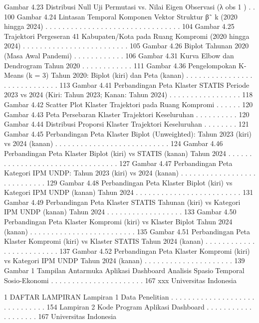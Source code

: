 Gambar 4.23 Distribusi Null Uji Permutasi vs. Nilai Eigen Observasi (λ
obs
1
) . . 100
Gambar 4.24 Lintasan Temporal Komponen Vektor Struktur β˜
k (2020 hingga
2024) . . . . . . . . . . . . . . . . . . . . . . . . . . . . . . . . 104
Gambar 4.25 Trajektori Pergeseran 41 Kabupaten/Kota pada Ruang Kompromi
(2020 hingga 2024) . . . . . . . . . . . . . . . . . . . . . . . . . 105
Gambar 4.26 Biplot Tahunan 2020 (Masa Awal Pandemi) . . . . . . . . . . . . 106
Gambar 4.31 Kurva Elbow dan Dendrogram Tahun 2020 . . . . . . . . . . . . 111
Gambar 4.36 Pengelompokan K-Means (k = 3) Tahun 2020: Biplot (kiri) dan
Peta (kanan) . . . . . . . . . . . . . . . . . . . . . . . . . . . . . 113
Gambar 4.41 Perbandingan Peta Klaster STATIS Periode 2023 vs 2024 (Kiri:
Tahun 2023; Kanan: Tahun 2024) . . . . . . . . . . . . . . . . . 118
Gambar 4.42 Scatter Plot Klaster Trajektori pada Ruang Kompromi . . . . . . 120
Gambar 4.43 Peta Persebaran Klaster Trajektori Keseluruhan . . . . . . . . . . 120
Gambar 4.44 Distribusi Proporsi Klaster Trajektori Keseluruhan . . . . . . . . 121
Gambar 4.45 Perbandingan Peta Klaster Biplot (Unweighted): Tahun 2023 (kiri)
vs 2024 (kanan) . . . . . . . . . . . . . . . . . . . . . . . . . . . 124
Gambar 4.46 Perbandingan Peta Klaster Biplot (kiri) vs STATIS (kanan) Tahun
2024 . . . . . . . . . . . . . . . . . . . . . . . . . . . . . . . . . 127
Gambar 4.47 Perbandingan Peta Kategori IPM UNDP: Tahun 2023 (kiri) vs
2024 (kanan) . . . . . . . . . . . . . . . . . . . . . . . . . . . . 129
Gambar 4.48 Perbandingan Peta Klaster Biplot (kiri) vs Kategori IPM UNDP
(kanan) Tahun 2024 . . . . . . . . . . . . . . . . . . . . . . . . . 131
Gambar 4.49 Perbandingan Peta Klaster STATIS Tahunan (kiri) vs Kategori
IPM UNDP (kanan) Tahun 2024 . . . . . . . . . . . . . . . . . . 133
Gambar 4.50 Perbandingan Peta Klaster Kompromi (kiri) vs Klaster Biplot
Tahun 2024 (kanan) . . . . . . . . . . . . . . . . . . . . . . . . . 135
Gambar 4.51 Perbandingan Peta Klaster Kompromi (kiri) vs Klaster STATIS
Tahun 2024 (kanan) . . . . . . . . . . . . . . . . . . . . . . . . . 137
Gambar 4.52 Perbandingan Peta Klaster Kompromi (kiri) vs Kategori IPM
UNDP Tahun 2024 (kanan) . . . . . . . . . . . . . . . . . . . . . 139
Gambar 1 Tampilan Antarmuka Aplikasi Dashboard Analisis SpasioTemporal Sosio-Ekonomi . . . . . . . . . . . . . . . . . . . . . . 167
xxx Universitas Indonesia

1
DAFTAR LAMPIRAN
Lampiran 1 Data Penelitian . . . . . . . . . . . . . . . . . . . . . . . . . . . . . . 154
Lampiran 2 Kode Program Aplikasi Dashboard . . . . . . . . . . . . . . . . . . . 167
Universitas Indonesia

